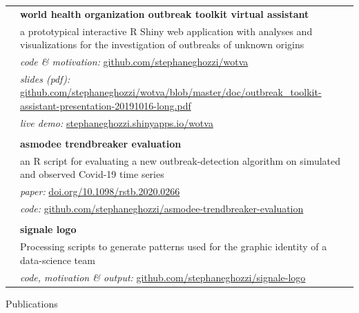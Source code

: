 \documentclass[a4paper,11pt,oneside]{article}
\begin{document}
\noindent \begin{longtable}{@{}p{3.1cm}@{}@{}p{13.9cm}@{}} 
   & \textbf{world health organization outbreak toolkit virtual assistant} \\
   & a prototypical interactive R Shiny web application with analyses and visualizations for the investigation of outbreaks of unknown origins \\ 
   & \emph{code \& motivation:} \href{https://github.com/stephaneghozzi/wotva}{github.com/stephaneghozzi/wotva} \\
   & \emph{slides (pdf):} \href{https://github.com/stephaneghozzi/wotva/blob/master/doc/outbreak\_toolkit-assistant-presentation-20191016-long.pdf}{github.com/stephaneghozzi/wotva/blob/master/doc/outbreak\_toolkit-assistant-presentation-20191016-long.pdf} \\
   & \emph{live demo:} \href{https://stephaneghozzi.shinyapps.io/wotva}{stephaneghozzi.shinyapps.io/wotva} \\
   & \\
   & \textbf{asmodee trendbreaker evaluation} \\
   & an R script for evaluating a new outbreak-detection algorithm on simulated and observed Covid-19 time series \\
   & \emph{paper:} \href{https://doi.org/10.1098/rstb.2020.0266}{doi.org/10.1098/rstb.2020.0266}\\
   & \emph{code:} \href{https://github.com/stephaneghozzi/asmodee-trendbreaker-evaluation}{github.com/stephaneghozzi/asmodee-trendbreaker-evaluation} \\
   & \\
   & \textbf{signale logo} \\
   & Processing scripts to generate patterns used for the graphic identity of a data-science team \\
   & \emph{code, motivation \& output:} \href{https://github.com/stephaneghozzi/signale-logo}{github.com/stephaneghozzi/signale-logo} \\
\end{longtable}

\vspace{1em}

\noindent {\color{gray}\hrule} 
   
\vspace{2em}
   
\noindent \Large{Publications}

\vspace{0.5em}

\normalsize
\nocite{*}
\begingroup
\renewcommand{\section}[2]{}


\endgroup
\end{document}
